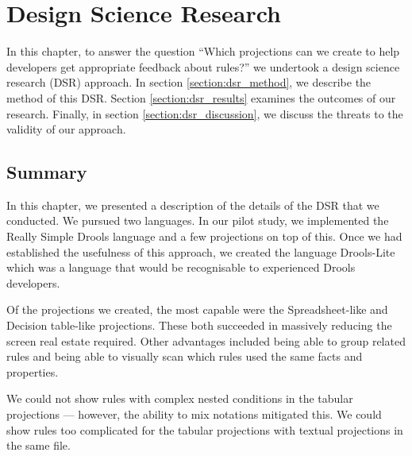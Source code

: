 \chapter{Design Science Research}
\label{chapter:DSR}

In this chapter, to answer the question ``Which projections can we create to help developers get appropriate feedback about rules?'' we undertook a design science research (DSR) approach.
In section \ref{section:dsr_method}, we describe the method of this DSR.
Section \ref{section:dsr_results} examines the outcomes of our research.
Finally, in section \ref{section:dsr_discussion}, we discuss the threats to the validity of our approach.







\section{Summary}
In this chapter, we presented a description of the details of the DSR that we conducted.
We pursued two languages.
In our pilot study, we implemented the Really Simple Drools language and a few projections on top of this.
Once we had established the usefulness of this approach, we created the language Drools-Lite which was a language that would be recognisable to experienced Drools developers.

Of the projections we created, the most capable were the Spreadsheet-like and Decision table-like projections.
These both succeeded in massively reducing the screen real estate required.
Other advantages included being able to group related rules and being able to visually scan which rules used the same facts and properties.

We could not show rules with complex nested conditions in the tabular projections — however, the ability to mix notations mitigated this.
We could show rules too complicated for the tabular projections with textual projections in the same file.